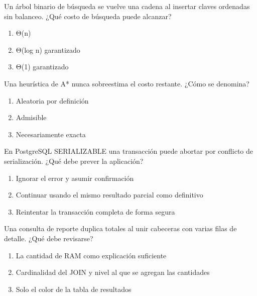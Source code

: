 \noindent\begin{minipage}{\linewidth}\setlength{\parskip}{4pt}\label{q:S-094}
Un árbol binario de búsqueda se vuelve una cadena al insertar claves ordenadas sin balanceo. ¿Qué costo de búsqueda puede alcanzar?
\begin{enumerate}[label=\Alph*),nosep]
\item Θ(n)
\item Θ(log n) garantizado
\item Θ(1) garantizado
\end{enumerate}\end{minipage}\par\medskip

\noindent\begin{minipage}{\linewidth}\setlength{\parskip}{4pt}\label{q:S-095}
Una heurística de A* nunca sobreestima el costo restante. ¿Cómo se denomina?
\begin{enumerate}[label=\Alph*),nosep]
\item Aleatoria por definición
\item Admisible
\item Necesariamente exacta
\end{enumerate}\end{minipage}\par\medskip

\noindent\begin{minipage}{\linewidth}\setlength{\parskip}{4pt}\label{q:S-096}
En PostgreSQL SERIALIZABLE una transacción puede abortar por conflicto de serialización. ¿Qué debe prever la aplicación?
\begin{enumerate}[label=\Alph*),nosep]
\item Ignorar el error y asumir confirmación
\item Continuar usando el mismo resultado parcial como definitivo
\item Reintentar la transacción completa de forma segura
\end{enumerate}\end{minipage}\par\medskip

\noindent\begin{minipage}{\linewidth}\setlength{\parskip}{4pt}\label{q:S-097}
Una consulta de reporte duplica totales al unir cabeceras con varias filas de detalle. ¿Qué debe revisarse?
\begin{enumerate}[label=\Alph*),nosep]
\item La cantidad de RAM como explicación suficiente
\item Cardinalidad del JOIN y nivel al que se agregan las cantidades
\item Solo el color de la tabla de resultados
\end{enumerate}\end{minipage}\par\medskip

